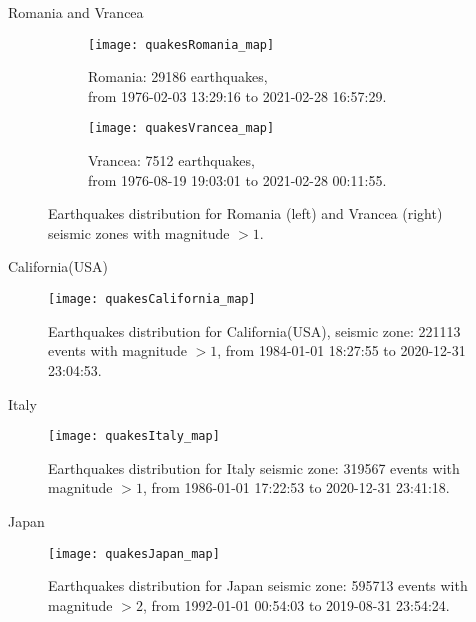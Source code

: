 \begin{frame}{Romania and Vrancea} 

\begin{figure}[!h]
\begin{subfigure}{.5\textwidth}
  \centering
  \texttt{[image: quakesRomania\_map]}
  \caption{Romania: 29186 earthquakes,\\ from 1976-02-03 13:29:16 to 2021-02-28 16:57:29.}
  \label{fig:sfigRo}
\end{subfigure}%
\begin{subfigure}{.5\textwidth}
  \centering
  \texttt{[image: quakesVrancea\_map]}
  \caption{Vrancea: 7512 earthquakes,\\ from 1976-08-19 19:03:01 to 2021-02-28 00:11:55.}
  \label{fig:sfigVrancea}
\end{subfigure}
\caption{Earthquakes distribution for Romania (left) and Vrancea (right) seismic zones with magnitude $>1$.}
\label{fig:simpleScatterRoVr}
\end{figure}

\end{frame}


\begin{frame}{California(USA)}
\begin{figure}[!h]
\centering
\texttt{[image: quakesCalifornia\_map]}
\caption{Earthquakes distribution for California(USA), seismic zone: 221113 events with magnitude $>1$, from 1984-01-01 18:27:55 to 2020-12-31 23:04:53.}
\label{fig:simpleScatteritaly}
\end{figure}
\end{frame}



\begin{frame}{Italy}

\begin{figure}[!h]
\centering
\texttt{[image: quakesItaly\_map]}
\caption{Earthquakes distribution for Italy seismic zone: 319567 events with magnitude $>1$, from 1986-01-01 17:22:53 to 2020-12-31 23:41:18.}
\label{fig:simpleScatteritaly}
\end{figure}

\end{frame}


\begin{frame}{Japan}
\begin{figure}[!h]
\centering
\texttt{[image: quakesJapan\_map]}
\caption{Earthquakes distribution for Japan seismic zone: 595713 events with magnitude $>2$, from 1992-01-01 00:54:03 to 2019-08-31 23:54:24.}
\label{fig:simpleScatterJapan}
\end{figure}
\end{frame}


